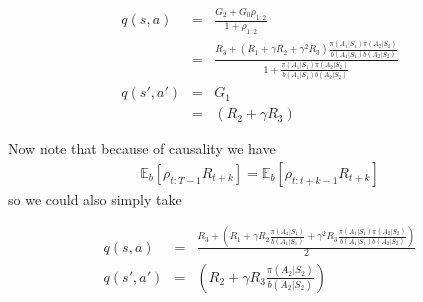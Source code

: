 \documentclass[11pt,a4paper]{article}
\newcommand\bea{\begin{eqnarray}}
\newcommand\eea{\end{eqnarray}}
\newcommand{\nn}{\nonumber \\}
\begin{document}
\bea
q(s,a) &=&  \frac{G_2 + G_0 \rho_{1:2}}{1+\rho_{1:2}} \nn
&=&\frac{ R_3 + (R_1 + \gamma R_2 + \gamma^2 R_3) \frac{\pi(A_1|S_1)\pi(A_2|S_2)}{b(A_1|S_1)b(A_2|S_2)}}{1+\frac{\pi(A_1|S_1)\pi(A_2|S_2)}{b(A_1|S_1)b(A_2|S_2)}} \\
q(s',a') &=& G_1 \nn
&=& (R_2 + \gamma R_3)
\eea

Now note that because of causality we have
\bea
\mathbb E_b [ \rho_{t:T-1}R_{t+k} ] = \mathbb E_b [ \rho_{t:t+k-1}R_{t+k} ]
\eea
so we could also simply take

\bea
q(s,a) &=&  \frac{ R_3 + (R_1 + \gamma R_2 \frac{\pi(A_1|S_1)}{b(A_1|S_1)} + \gamma^2 R_3 \frac{\pi(A_1|S_1)\pi(A_2|S_2)}{b(A_1|S_1)b(A_2|S_2)} ) }{2} \\
q(s',a') &=& (R_2 + \gamma R_3 \frac{\pi(A_2|S_2)}{b(A_2|S_2)})
\eea
\end{document}
